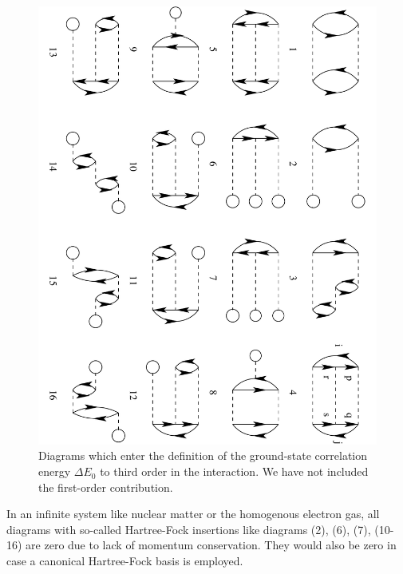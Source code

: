 \begin{figure}
    \includegraphics[width=\linewidth]{Chapter8-figures/mbpt.pdf}
      \caption{Diagrams which enter the definition of the ground-state
      correlation energy $\Delta E_0$ to third order in the interaction. We have not included the first-order contribution.}
      \label{fig:goldstone}
\end{figure}
In an infinite system like nuclear matter or the homogenous electron gas, all diagrams with so-called Hartree-Fock insertions like diagrams (2), (6), (7), (10-16) are zero 
due to lack of momentum conservation. They would also be zero in case a canonical \cite{shavittbartlett2009} Hartree-Fock basis is employed. 

